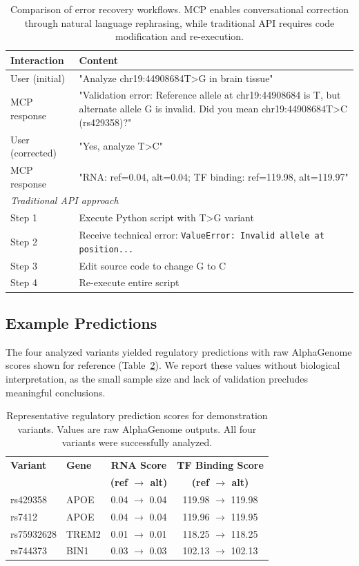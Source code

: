 \documentclass[11pt]{article}
\begin{document}
\begin{table}[h]
\centering
\begin{tabular}{p{2.5cm}p{9cm}}
\toprule
\textbf{Interaction} & \textbf{Content} \\
\midrule
User (initial) & "Analyze chr19:44908684T>G in brain tissue" \\
MCP response & "Validation error: Reference allele at chr19:44908684 is T, but alternate allele G is invalid. Did you mean chr19:44908684T>C (rs429358)?" \\
User (corrected) & "Yes, analyze T>C" \\
MCP response & "RNA: ref=0.04, alt=0.04; TF binding: ref=119.98, alt=119.97" \\
\midrule
\multicolumn{2}{l}{\textit{Traditional API approach}} \\
\midrule
Step 1 & Execute Python script with T>G variant \\
Step 2 & Receive technical error: \texttt{ValueError: Invalid allele at position...} \\
Step 3 & Edit source code to change G to C \\
Step 4 & Re-execute entire script \\
\bottomrule
\end{tabular}
\caption{Comparison of error recovery workflows. MCP enables conversational correction through natural language rephrasing, while traditional API requires code modification and re-execution.}
\label{tab:error_recovery}
\end{table}

\subsection{Example Predictions}

The four analyzed variants yielded regulatory predictions with raw AlphaGenome scores shown for reference (Table~\ref{tab:predictions}). We report these values without biological interpretation, as the small sample size and lack of validation precludes meaningful conclusions.

\begin{table}[h]
\centering
\begin{tabular}{llcc}
\toprule
\textbf{Variant} & \textbf{Gene} & \textbf{RNA Score} & \textbf{TF Binding Score} \\
 & & \textbf{(ref $\rightarrow$ alt)} & \textbf{(ref $\rightarrow$ alt)} \\
\midrule
rs429358 & APOE & 0.04 $\rightarrow$ 0.04 & 119.98 $\rightarrow$ 119.98 \\
rs7412 & APOE & 0.04 $\rightarrow$ 0.04 & 119.96 $\rightarrow$ 119.95 \\
rs75932628 & TREM2 & 0.01 $\rightarrow$ 0.01 & 118.25 $\rightarrow$ 118.25 \\
rs744373 & BIN1 & 0.03 $\rightarrow$ 0.03 & 102.13 $\rightarrow$ 102.13 \\
\bottomrule
\end{tabular}
\caption{Representative regulatory prediction scores for demonstration variants. Values are raw AlphaGenome outputs. All four variants were successfully analyzed.}
\label{tab:predictions}
\end{table}
\end{document}
